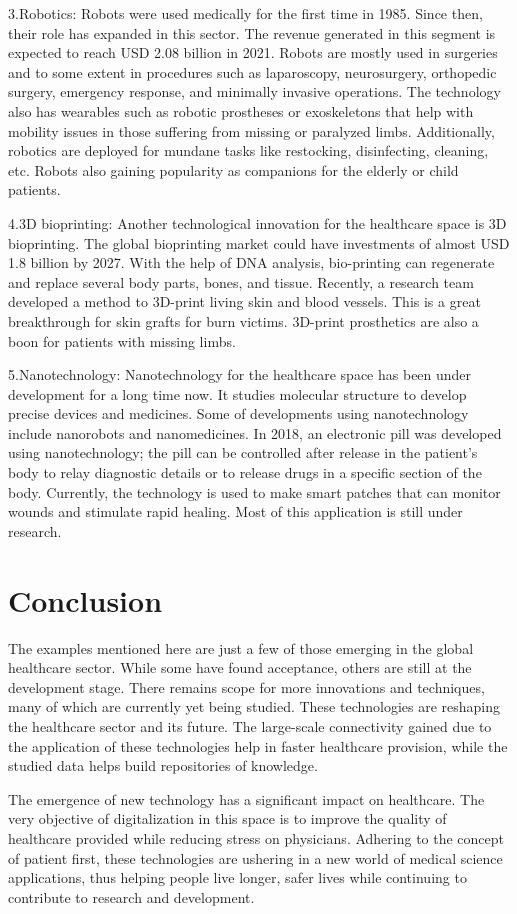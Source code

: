\documentclass[12pt]{article}
\begin{document}
3.Robotics: Robots were used medically for the first time in 1985. Since then, their role has expanded in this sector. The revenue generated in this segment is expected to reach USD 2.08 billion in 2021. Robots are mostly used in surgeries and to some extent in procedures such as laparoscopy, neurosurgery, orthopedic surgery, emergency response, and minimally invasive operations. The technology also has wearables such as robotic prostheses or exoskeletons that help with mobility issues in those suffering from missing or paralyzed limbs. Additionally, robotics are deployed for mundane tasks like restocking, disinfecting, cleaning, etc. Robots also gaining popularity as companions for the elderly or child patients.

4.3D bioprinting: Another technological innovation for the healthcare space is 3D bioprinting. The global bioprinting market could have investments of almost USD 1.8 billion by 2027. With the help of DNA analysis, bio-printing can regenerate and replace several body parts, bones, and tissue. Recently, a research team developed a method to 3D-print living skin and blood vessels. This is a great breakthrough for skin grafts for burn victims. 3D-print prosthetics are also a boon for patients with missing limbs.

5.Nanotechnology: Nanotechnology for the healthcare space has been under development for a long time now. It studies molecular structure to develop precise devices and medicines. Some of developments using nanotechnology include nanorobots and nanomedicines. In 2018, an electronic pill was developed using nanotechnology; the pill can be controlled after release in the patient’s body to relay diagnostic details or to release drugs in a specific section of the body. Currently, the technology is used to make smart patches that can monitor wounds and stimulate rapid healing. Most of this application is still under research.

\section{Conclusion}
The examples mentioned here are just a few of those emerging in the global healthcare sector. While some have found acceptance, others are still at the development stage. There remains scope for more innovations and techniques, many of which are currently yet being studied. These technologies are reshaping the healthcare sector and its future. The large-scale connectivity gained due to the application of these technologies help in faster healthcare provision, while the studied data helps build repositories of knowledge.

The emergence of new technology has a significant impact on healthcare. The very objective of digitalization in this space is to improve the quality of healthcare provided while reducing stress on physicians. Adhering to the concept of patient first, these technologies are ushering in a new world of medical science applications, thus helping people live longer, safer lives while continuing to contribute to research and development.
\end{document}
